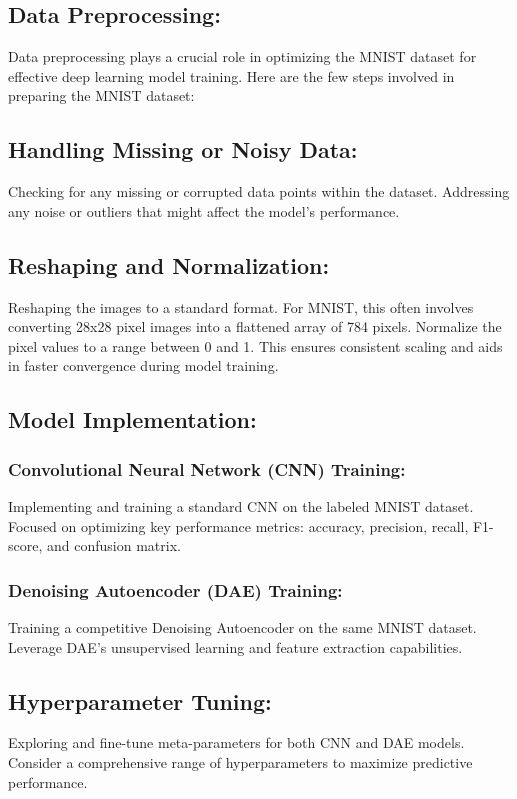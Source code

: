 \subsection{Data Preprocessing:}
Data preprocessing plays a crucial role in optimizing the MNIST dataset for effective deep learning model training. Here are the few steps involved in preparing the MNIST dataset:

\subsection{Handling Missing or Noisy Data:}

Checking for any missing or corrupted data points within the dataset.
Addressing any noise or outliers that might affect the model's performance.

\subsection{Reshaping and Normalization:}

Reshaping the images to a standard format. For MNIST, this often involves converting 28x28 pixel images into a flattened array of 784 pixels.
Normalize the pixel values to a range between 0 and 1. This ensures consistent scaling and aids in faster convergence during model training.

\subsection{Model Implementation:}
\subsubsection{Convolutional Neural Network (CNN) Training:}
Implementing and training a standard CNN on the labeled MNIST dataset.
Focused on optimizing key performance metrics: accuracy, precision, recall, F1-score, and confusion matrix.

\subsubsection{Denoising Autoencoder (DAE) Training:}
Training a competitive Denoising Autoencoder on the same MNIST dataset.
Leverage DAE's unsupervised learning and feature extraction capabilities.

\subsection{Hyperparameter Tuning:}
Exploring and fine-tune meta-parameters for both CNN and DAE models.
Consider a comprehensive range of hyperparameters to maximize predictive performance.

